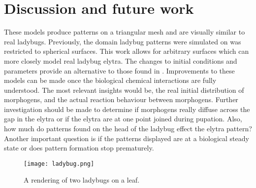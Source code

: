 \section{Discussion and future work}
These models produce patterns on a triangular mesh and are visually similar to real ladybugs. Previously, the domain ladybug patterns were simulated on was restricted to spherical surfaces. This work allows for arbitrary surfaces which can more closely model real ladybug elytra. The changes to initial conditions and parameters provide an alternative to those found in \citep{liaw2001}. Improvements to these models can be made once the biological chemical interactions are fully understood. The most relevant insights would be, the real initial distribution of morphogens, and the actual reaction behaviour between morphogens. Further investigation should be made to determine if morphogens really diffuse across the gap in the elytra or if the elytra are at one point joined during pupation. Also, how much do patterns found on the head of the ladybug effect the elytra pattern? Another important question is if the patterns displayed are at a biological steady state or does pattern formation stop prematurely.

\begin{figure}[p]
	\centering
	\texttt{[image: ladybug.png]}
	\caption{A rendering of two ladybugs on a leaf.}
	\label{fig:ladybugRender}
\end{figure}